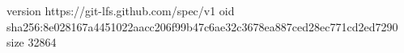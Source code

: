 version https://git-lfs.github.com/spec/v1
oid sha256:8e028167a4451022aacc206f99b47c6ae32c3678ea887ced28ec771cd2ed7290
size 32864
